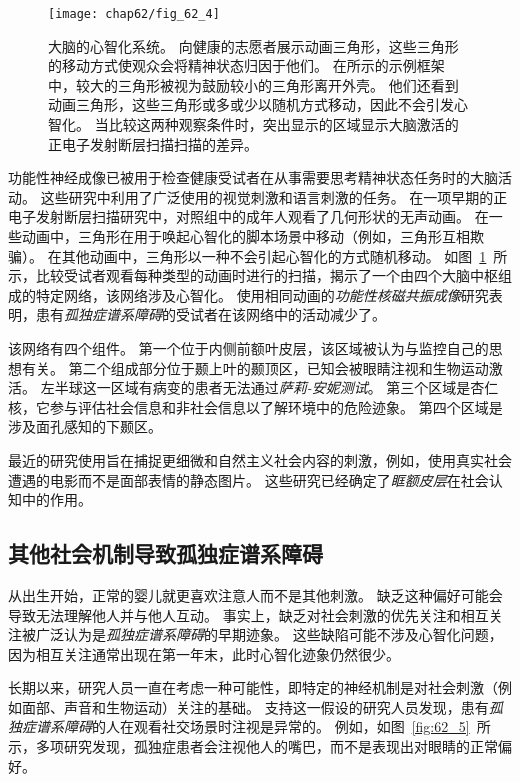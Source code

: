 \begin{figure}[htbp]
	\centering
	\texttt{[image: chap62/fig\_62\_4]}
	\caption{大脑的心智化系统。
		向健康的志愿者展示动画三角形，这些三角形的移动方式使观众会将精神状态归因于他们。
		在所示的示例框架中，较大的三角形被视为鼓励较小的三角形离开外壳。
		他们还看到动画三角形，这些三角形或多或少以随机方式移动，因此不会引发心智化。
		当比较这两种观察条件时，突出显示的区域显示大脑激活的正电子发射断层扫描扫描的差异\cite{castelli2002autism}。}
	\label{fig:62_4}
\end{figure}


功能性神经成像已被用于检查健康受试者在从事需要思考精神状态任务时的大脑活动。
这些研究中利用了广泛使用的视觉刺激和语言刺激的任务。
在一项早期的正电子发射断层扫描研究中，对照组中的成年人观看了几何形状的无声动画。
在一些动画中，三角形在用于唤起心智化的脚本场景中移动（例如，三角形互相欺骗）。
在其他动画中，三角形以一种不会引起心智化的方式随机移动。
如图~\ref{fig:62_4}~所示，比较受试者观看每种类型的动画时进行的扫描，揭示了一个由四个大脑中枢组成的特定网络，该网络涉及心智化。
使用相同动画的\textit{功能性核磁共振成像}研究表明，患有\textit{孤独症谱系障碍}的受试者在该网络中的活动减少了。


该网络有四个组件。
第一个位于内侧前额叶皮层，该区域被认为与监控自己的思想有关。
第二个组成部分位于颞上叶的颞顶区，已知会被眼睛注视和生物运动激活。
左半球这一区域有病变的患者无法通过\textit{萨莉-安妮测试}。
第三个区域是杏仁核，它参与评估社会信息和非社会信息以了解环境中的危险迹象。
第四个区域是涉及面孔感知的下颞区。


最近的研究使用旨在捕捉更细微和自然主义社会内容的刺激，例如，使用真实社会遭遇的电影而不是面部表情的静态图片。
这些研究已经确定了\textit{眶额皮层}在社会认知中的作用。



\subsection{其他社会机制导致孤独症谱系障碍}

从出生开始，正常的婴儿就更喜欢注意人而不是其他刺激。
缺乏这种偏好可能会导致无法理解他人并与他人互动。
事实上，缺乏对社会刺激的优先关注和相互关注被广泛认为是\textit{孤独症谱系障碍}的早期迹象。
这些缺陷可能不涉及心智化问题，因为相互关注通常出现在第一年末，此时心智化迹象仍然很少。


长期以来，研究人员一直在考虑一种可能性，即特定的神经机制是对社会刺激（例如面部、声音和生物运动）关注的基础。
支持这一假设的研究人员发现，患有\textit{孤独症谱系障碍}的人在观看社交场景时注视是异常的。
例如，如图~\ref{fig:62_5}~所示，多项研究发现，孤独症患者会注视他人的嘴巴，而不是表现出对眼睛的正常偏好。


